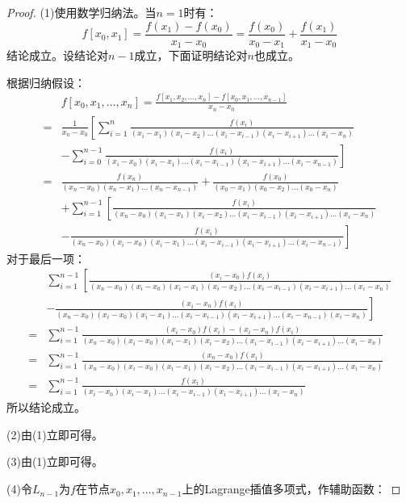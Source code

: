 \begin{proof}
	(1)使用数学归纳法。当$n=1$时有：
	\begin{equation*}
		f[x_0,x_1]=\frac{f(x_1)-f(x_0)}{x_1-x_0}=\frac{f(x_0)}{x_0-x_1}+\frac{f(x_1)}{x_1-x_0}
	\end{equation*}
	结论成立。设结论对$n-1$成立，下面证明结论对$n$也成立。\par
	根据归纳假设：
	\begin{align*}
		&f[x_0,x_1,\dots,x_n]=\frac{f[x_1,x_2,\dots,x_n]-f[x_0,x_1,\dots,x_{n-1}]}{x_n-x_0} \\
		=&\frac{1}{x_n-x_0}\left[\sum_{i=1}^{n}\frac{f(x_i)}{(x_i-x_1)(x_i-x_2)\dots(x_i-x_{i-1})(x_i-x_{i+1})\dots(x_i-x_n)}\right. \\
		&\left.-\sum_{i=0}^{n-1}\frac{f(x_i)}{(x_i-x_0)(x_i-x_1)\dots(x_i-x_{i-1})(x_i-x_{i+1})\dots(x_i-x_{n-1})}\right]  \\
		=&\frac{f(x_n)}{(x_n-x_0)(x_n-x_1)\dots(x_n-x_{n-1})}+\frac{f(x_0)}{(x_0-x_1)(x_0-x_2)\dots(x_0-x_n)} \\
		&+\sum_{i=1}^{n-1}\left[\frac{f(x_i)}{(x_n-x_0)(x_i-x_1)(x_i-x_2)\dots(x_i-x_{i-1})(x_i-x_{i+1})\dots(x_i-x_n)}\right. \\
		&\left.-\frac{f(x_i)}{(x_n-x_0)(x_i-x_0)(x_i-x_1)\dots(x_i-x_{i-1})(x_i-x_{i+1})\dots(x_i-x_{n-1})}\right]
	\end{align*}
	对于最后一项：
	\begin{align*}
		&\sum_{i=1}^{n-1}\left[\frac{(x_i-x_0)f(x_i)}{(x_n-x_0)(x_i-x_0)(x_i-x_1)(x_i-x_2)\dots(x_i-x_{i-1})(x_i-x_{i+1})\dots(x_i-x_n)}\right. \\
		&\left.-\frac{(x_i-x_n)f(x_i)}{(x_n-x_0)(x_i-x_0)(x_i-x_1)\dots(x_i-x_{i-1})(x_i-x_{i+1})\dots(x_i-x_{n-1})(x_i-x_n)}\right] \\
		=&\sum_{i=1}^{n-1}\frac{(x_i-x_0)f(x_i)-(x_i-x_n)f(x_i)}{(x_n-x_0)(x_i-x_0)(x_i-x_1)(x_i-x_2)\dots(x_i-x_{i-1})(x_i-x_{i+1})\dots(x_i-x_n)} \\
		=&\sum_{i=1}^{n-1}\frac{(x_n-x_0)f(x_i)}{(x_n-x_0)(x_i-x_0)(x_i-x_1)(x_i-x_2)\dots(x_i-x_{i-1})(x_i-x_{i+1})\dots(x_i-x_n)} \\
		=&\sum_{i=1}^{n-1}\frac{f(x_i)}{(x_i-x_0)(x_i-x_1)\dots(x_i-x_{i-1})(x_i-x_{i+1})\dots(x_i-x_n)}
	\end{align*}
	所以结论成立。\par
	(2)由(1)立即可得。\par
	(3)由(1)立即可得。\par
	(4)令$L_{n-1}$为$f$在节点$x_0,x_1,\dots,x_{n-1}$上的Lagrange插值多项式，作辅助函数：

\end{proof}
